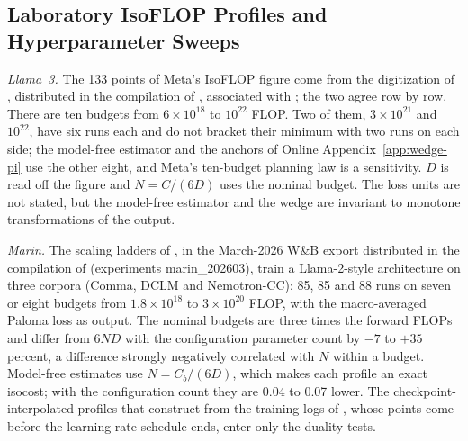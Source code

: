 \subsection{Laboratory IsoFLOP Profiles and Hyperparameter Sweeps}\label{app:isoflop}

\textit{Llama~3.} The 133 points of Meta's IsoFLOP figure \citep{grattafiori2024llama} come from the digitization of
\citet{czech2026llama3isoflop}, distributed in the compilation of \citet{openathena2026isoflop}, associated with
\citet{czech2026problems}; the two agree row by row.
There are ten budgets from $6\times10^{18}$ to $10^{22}$ FLOP. Two of them, $3\times10^{21}$ and $10^{22}$, have six
runs each and do not bracket their minimum with two runs on each side; the model-free estimator and the anchors of Online
Appendix~\ref{app:wedge-pi} use the other eight, and Meta's ten-budget planning law is a sensitivity. $D$ is read off
the figure and $N=C/(6D)$ uses the nominal budget. The loss units are not stated, but the model-free estimator and the
wedge are invariant to monotone transformations of the output.

\textit{Marin.} The scaling ladders of \citet{marin2026ladders}, in the March-2026 W\&B export distributed in the
compilation of \citet{openathena2026isoflop} (experiments marin\_202603), train a Llama-2-style architecture on three corpora
(Comma, DCLM and Nemotron-CC): 85, 85 and 88 runs on seven or eight budgets from $1.8\times10^{18}$ to $3\times10^{20}$
FLOP, with the macro-averaged Paloma loss as output. The nominal budgets are three times the forward FLOPs and differ from
$6ND$ with the configuration parameter count by $-7$ to $+35$ percent, a difference strongly negatively correlated with
$N$ within a budget. Model-free estimates use $N=C_b/(6D)$, which makes each profile an exact isocost; with the
configuration count they are 0.04 to 0.07 lower. The checkpoint-interpolated profiles that \citet{czech2026problems}
construct from the training logs of \citet{li2025misfitting}, whose points come before the learning-rate schedule ends,
enter only the duality tests.


